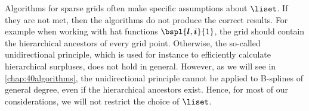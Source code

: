 Algorithms for sparse grids often make specific assumptions about $\liset$.
If they are not met, then the algorithms do not produce the correct results.
For example when working with hat functions $\bspl{\*l,\*i}{1}$,
the grid should contain the hierarchical ancestors of every grid point.
Otherwise, the so-called
unidirectional principle, which is used for instance to efficiently calculate
hierarchical surpluses, does not hold in general.
However, as we will see in \cref{chap:40algorithms},
the unidirectional principle cannot be applied
to B-splines of general degree, even if the hierarchical ancestors exist.
Hence, for most of our considerations, we will not restrict the
choice of $\liset$.
